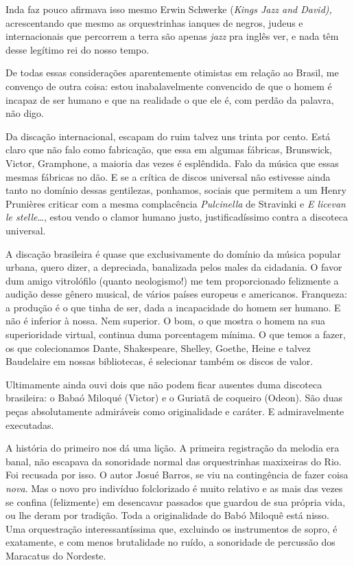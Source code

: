 Inda faz pouco afirmava isso mesmo Erwin Schwerke (\textit{Kings Jazz and
David),} acrescentando que mesmo as orquestrinhas ianques de negros,
judeus e internacionais que percorrem a terra são apenas \textit{jazz} pra
inglês ver, e nada têm desse legítimo rei do nosso tempo.

De todas essas considerações aparentemente otimistas em relação ao
Brasil, me convenço de outra coisa: estou inabalavelmente convencido de
que o homem é incapaz de ser humano e que na realidade o que ele é, com
perdão da palavra, não digo.

Da discação internacional, escapam do ruim talvez uns trinta por cento.
Está claro que não falo como fabricação, que essa em algumas fábricas,
Brunswick, Victor, Gramphone, a maioria das vezes é esplêndida. Falo da
música que essas mesmas fábricas no dão. E se a crítica de discos
universal não estivesse ainda tanto no domínio dessas gentilezas,
ponhamos, sociais que permitem a um Henry Prunières criticar com a mesma
complacência \textit{Pulcinella} de Stravinki e \textit{E licevan le stelle}\ldots{}, estou
vendo o clamor humano justo, justificadíssimo contra a discoteca
universal.

A discação brasileira é quase que exclusivamente do domínio da música
popular urbana, quero dizer, a depreciada, banalizada pelos males da
cidadania. O favor dum amigo vitrolófilo (quanto neologismo!) me tem
proporcionado felizmente a audição desse gênero musical, de vários
países europeus e americanos. Franqueza: a produção é o que tinha de
ser, dada a incapacidade do homem ser humano. E não é inferior à nossa.
Nem superior. O bom, o que mostra o homem na sua superioridade virtual,
continua duma porcentagem mínima. O que temos a fazer, os que
colecionamos Dante, Shakespeare, Shelley, Goethe, Heine e talvez
Baudelaire em nossas bibliotecas, é selecionar também os discos de
valor.

Ultimamente ainda ouvi dois que não podem ficar ausentes duma discoteca
brasileira: o Babaó Miloqué (Victor) e o Guriatã de coqueiro (Odeon).
São duas peças absolutamente admiráveis como originalidade e caráter. E
admiravelmente executadas.

A história do primeiro nos dá uma lição. A primeira registração da
melodia era banal, não escapava da sonoridade normal das orquestrinhas
maxixeiras do Rio. Foi recusada por isso. O autor Josué Barros, se viu
na contingência de fazer coisa \textit{nova}. Mas o novo pro indivíduo
folclorizado é muito relativo e as mais das vezes se confina
(felizmente) em desencavar passados que guardou de sua própria vida, ou
lhe deram por tradição. Toda a originalidade do Babó Miloquê está nisso.
Uma orquestração interessantíssima que, excluindo os instrumentos de
sopro, é exatamente, e com menos brutalidade no ruído, a sonoridade de
percussão dos Maracatus do Nordeste.

